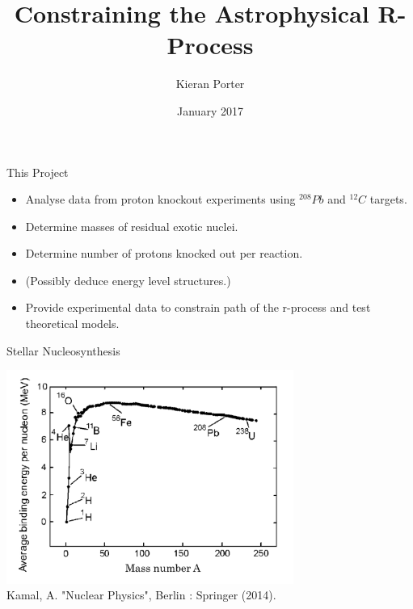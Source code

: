 \documentclass{beamer}
\title{Constraining the Astrophysical R-Process}
\author[Kieran Porter]{Kieran Porter \newline{\tiny Supervisor: Dan Watts}}
\date{January 2017}
\begin{document}
\maketitle


\begin{frame}{This Project}
\begin{itemize}
    \item Analyse data from proton knockout experiments using $^{208}Pb$ and $^{12}C$ targets.
    \item Determine masses of residual exotic nuclei.
    \item Determine number of protons knocked out per reaction.
    \item (Possibly deduce energy level structures.)
    \item Provide experimental data to constrain path of the r-process and test
    theoretical models.
\end{itemize}

\end{frame}



\begin{frame}{Stellar Nucleosynthesis}
    
    
        \centering
        \includegraphics[height = 7cm]{BindingEnergy}
        \\{\tiny Kamal, A. "Nuclear Physics", Berlin : Springer (2014).}
       
    
\end{frame}
\end{document}
